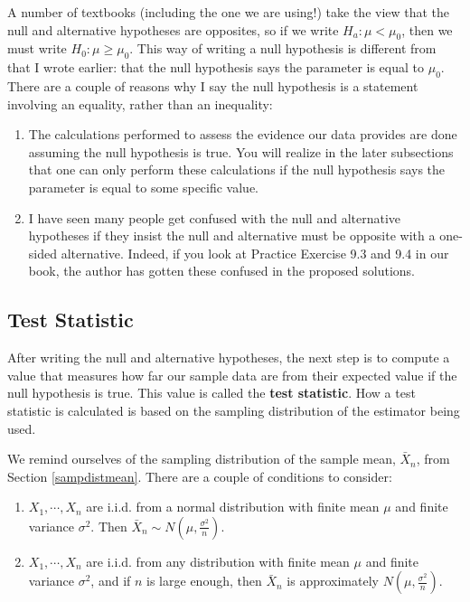 \documentclass[
]{book}
\begin{document}
A number of textbooks (including the one we are using!) take the view that the null and alternative hypotheses are opposites, so if we write \(H_a: \mu < \mu_0\), then we must write \(H_0: \mu \geq \mu_0\). This way of writing a null hypothesis is different from that I wrote earlier: that the null hypothesis says the parameter is equal to \(\mu_0\). There are a couple of reasons why I say the null hypothesis is a statement involving an equality, rather than an inequality:

\begin{enumerate}
\def\labelenumi{\arabic{enumi}.}
\item
  The calculations performed to assess the evidence our data provides are done assuming the null hypothesis is true. You will realize in the later subsections that one can only perform these calculations if the null hypothesis says the parameter is equal to some specific value.
\item
  I have seen many people get confused with the null and alternative hypotheses if they insist the null and alternative must be opposite with a one-sided alternative. Indeed, if you look at Practice Exercise 9.3 and 9.4 in our book, the author has gotten these confused in the proposed solutions.
\end{enumerate}

\hypertarget{test-statistic}{%
\subsection{Test Statistic}\label{test-statistic}}

After writing the null and alternative hypotheses, the next step is to compute a value that measures how far our sample data are from their expected value if the null hypothesis is true. This value is called the \textbf{test statistic}. How a test statistic is calculated is based on the sampling distribution of the estimator being used.

We remind ourselves of the sampling distribution of the sample mean, \(\bar{X}_n\), from Section \ref{sampdistmean}. There are a couple of conditions to consider:

\begin{enumerate}
\def\labelenumi{\arabic{enumi}.}
\item
  \(X_1, \cdots, X_n\) are i.i.d. from a normal distribution with finite mean \(\mu\) and finite variance \(\sigma^2\). Then \(\bar{X}_n \sim N(\mu, \frac{\sigma^2}{n})\).
\item
  \(X_1, \cdots, X_n\) are i.i.d. from any distribution with finite mean \(\mu\) and finite variance \(\sigma^2\), and if \(n\) is large enough, then \(\bar{X}_n\) is approximately \(N(\mu, \frac{\sigma^2}{n})\).
\end{enumerate}
\end{document}
